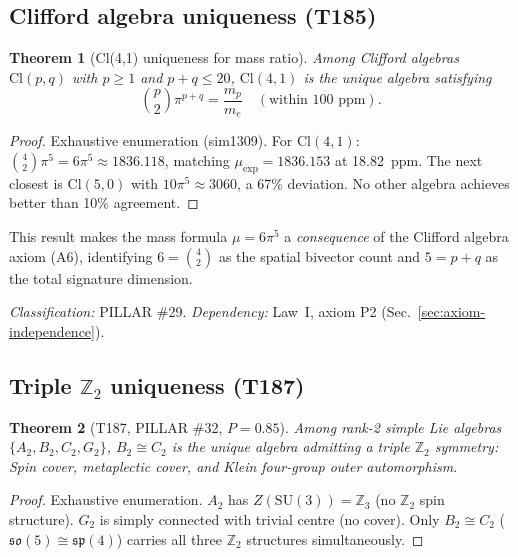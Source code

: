 \documentclass[aps,prd,twocolumn,superscriptaddress,floatfix,nofootinbib]{revtex4-2}
\newtheorem{theorem}{Theorem}
\theoremstyle{definition}
\theoremstyle{remark}
\begin{document}
\subsection{Clifford algebra uniqueness (T185)}
\label{sec:clifford-uniqueness}

\begin{theorem}[Cl(4,1) uniqueness for mass ratio]
Among Clifford algebras $\mathrm{Cl}(p,q)$ with $p \geq 1$ and $p+q \leq 20$,
$\mathrm{Cl}(4,1)$ is the unique algebra satisfying
\[
\binom{p}{2} \pi^{p+q} = \frac{m_p}{m_e} \quad (\text{within 100 ppm}).
\]
\end{theorem}

\begin{proof}
Exhaustive enumeration (sim1309). For $\mathrm{Cl}(4,1)$:
$\binom{4}{2}\pi^5 = 6\pi^5 \approx 1836.118$,
matching $\mu_{\mathrm{exp}} = 1836.153$ at 18.82~ppm. The next closest is
$\mathrm{Cl}(5,0)$ with $10\pi^5 \approx 3060$, a 67\% deviation. No other
algebra achieves better than 10\% agreement.
\end{proof}

This result makes the mass formula $\mu = 6\pi^5$ a \emph{consequence} of the
Clifford algebra axiom (A6), identifying $6 = \binom{4}{2}$ as the spatial
bivector count and $5 = p+q$ as the total signature dimension.

\noindent\textit{Classification:} PILLAR \#29.  \textit{Dependency:}
Law~I, axiom P2 (Sec.~\ref{sec:axiom-independence}).

\subsection{Triple $\mathbb{Z}_2$ uniqueness (T187)}
\label{sec:triple-z2}

\begin{theorem}[T187, PILLAR \#32, $P{=}0.85$]
Among rank-2 simple Lie algebras $\{A_2, B_2, C_2, G_2\}$,
$B_2 \cong C_2$ is the unique algebra admitting a triple
$\mathbb{Z}_2$ symmetry: Spin cover, metaplectic cover, and
Klein four-group outer automorphism.
\end{theorem}

\begin{proof}
Exhaustive enumeration.  $A_2$ has $Z(\mathrm{SU}(3)) = \mathbb{Z}_3$
(no $\mathbb{Z}_2$ spin structure).  $G_2$ is simply connected with
trivial centre (no cover).  Only $B_2 \cong C_2$ ($\mathfrak{so}(5)
\cong \mathfrak{sp}(4)$) carries all three $\mathbb{Z}_2$ structures
simultaneously.
\end{proof}
\end{document}
